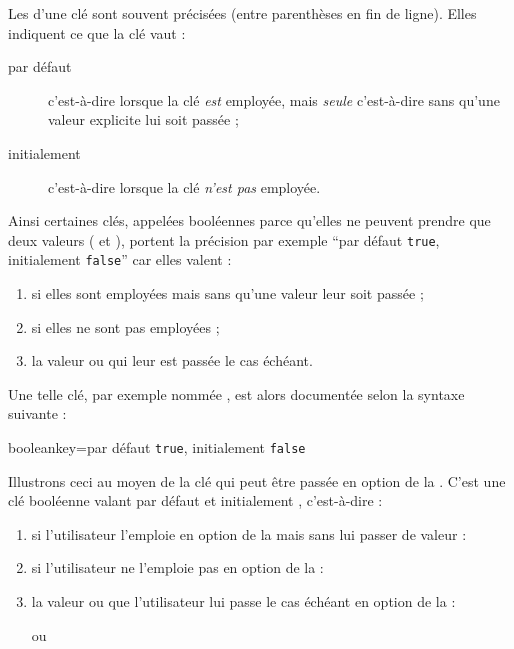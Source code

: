 Les  d'une clé sont souvent précisées
(entre parenthèses en fin de ligne). Elles indiquent ce que la clé vaut :
\begin{description}
\item[par défaut] c'est-à-dire lorsque la clé \emph{est} employée, mais
  \emph{seule} c'est-à-dire sans qu'une valeur explicite lui soit passée ;
\item[initialement] c'est-à-dire lorsque la clé \emph{n'est pas} employée.
\end{description}
%
Ainsi certaines clés, appelées booléennes parce qu'elles ne peuvent prendre que
deux valeurs ( et ), portent la précision par
exemple \enquote{par défaut \lstinline+true+, initialement \lstinline+false+}
car elles valent :
\begin{enumerate}
\item {} si elles sont employées mais sans qu'une valeur leur
  soit passée ;
\item {} si elles ne sont pas employées ;
\item la valeur  ou  qui leur est passée le
  cas échéant.
\end{enumerate}
Une telle clé, par exemple nommée , est alors documentée selon la
syntaxe suivante :
\begin{docKey*}{booleankey}{=\textbar{}}{par
    défaut \lstinline+true+, initialement \lstinline+false+}
\end{docKey*}

Illustrons ceci au moyen de la clé  qui peut être passée en
option de la \yatCl. C'est une clé booléenne valant par défaut 
et initialement , c'est-à-dire :
\begin{enumerate}
\item {} si l'utilisateur l'emploie en option de la \yatCl mais
  sans lui passer de valeur :
\item {} si l'utilisateur ne l'emploie pas en option de la \yatCl :
\item la valeur  ou  que l'utilisateur lui
  passe le cas échéant en option de la \yatCl :
ou
\end{enumerate}

